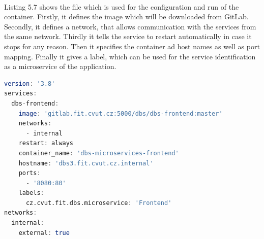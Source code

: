 \

\noindent Listing 5.7 shows the file which is used for the configuration and run of the container. Firstly, it defines the image which will be downloaded from GitLab. Secondly, it defines a network, that allows communication with the services from the same network. Thirdly it tells the service to restart automatically in case it stops for any reason. Then it specifies the container ad host names as well as port mapping. Finally it gives a label, which can be used for the service identification as a microservice of the application.

\begin{lstlisting}[language=Octave, caption=docker-compose.yml]
version: '3.8'
services:
  dbs-frontend:
    image: 'gitlab.fit.cvut.cz:5000/dbs/dbs-frontend:master'
    networks:
      - internal
    restart: always
    container_name: 'dbs-microservices-frontend'
    hostname: 'dbs3.fit.cvut.cz.internal'
    ports:
      - '8080:80'
    labels:
      cz.cvut.fit.dbs.microservice: 'Frontend'
networks:
  internal:
    external: true
\end{lstlisting}